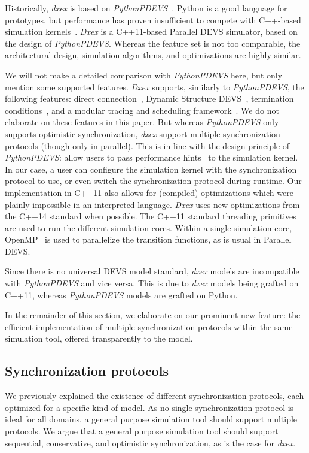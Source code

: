 Historically, \textit{dxex} is based on \textit{PythonPDEVS}~\cite{PythonPDEVS}.
Python is a good language for prototypes, but performance has proven insufficient to compete with C++-based simulation kernels~\cite{MasterThesis}.
\textit{Dxex} is a C++11-based \textsf{Parallel DEVS} simulator, based on the design of \textit{PythonPDEVS}.
Whereas the feature set is not too comparable, the architectural design, simulation algorithms, and optimizations are highly similar.

We will not make a detailed comparison with \textit{PythonPDEVS} here, but only mention some supported features.
\textit{Dxex} supports, similarly to \textit{PythonPDEVS}, the following features: direct connection~\cite{SymbolicFlattening}, \textsf{Dynamic Structure DEVS}~\cite{DSDEVS}, termination conditions~\cite{JDF}, and a modular tracing and scheduling framework~\cite{PythonPDEVS}.
We do not elaborate on these features in this paper.
But whereas \textit{PythonPDEVS} only supports optimistic synchronization, \textit{dxex} support multiple synchronization protocols (though only in parallel).
This is in line with the design principle of \textit{PythonPDEVS}: allow users to pass performance hints~\cite{PythonPDEVS_ACTIMS} to the simulation kernel.
In our case, a user can configure the simulation kernel with the synchronization protocol to use, or even switch the synchronization protocol during runtime.
Our implementation in C++11 also allows for (compiled) optimizations which were plainly impossible in an interpreted language.
\textit{Dxex} uses new optimizations from the C++14 standard when possible.
The C++11 standard threading primitives are used to run the different simulation cores.
Within a single simulation core, OpenMP~\cite{openmp4} is used to parallelize the transition functions, as is usual in \textsf{Parallel DEVS}.

Since there is no universal \textsf{DEVS} model standard, \textit{dxex} models are incompatible with \textit{PythonPDEVS} and vice versa.
This is due to \textit{dxex} models being grafted on C++11, whereas \textit{PythonPDEVS} models are grafted on Python.

In the remainder of this section, we elaborate on our prominent new feature: the efficient implementation of multiple synchronization protocols within the same simulation tool, offered transparently to the model.

\subsection{Synchronization protocols}
We previously explained the existence of different synchronization protocols, each optimized for a specific kind of model.
As no single synchronization protocol is ideal for all domains, a general purpose simulation tool should support multiple protocols.
We argue that a general purpose simulation tool should support sequential, conservative, and optimistic synchronization, as is the case for \textit{dxex}.

